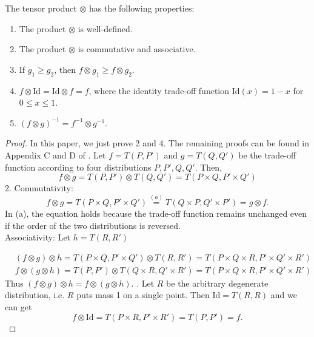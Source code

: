 \documentclass{article}
\begin{document}
\begin{theorem}
The tensor product $\otimes$ has the following properties:
    \begin{enumerate}
        \item The product $\otimes$ is well-defined.
        \item The product $\otimes$ is commutative and associative.
        \item If $g_1 \ge g_2$, then $f \otimes g_1 \ge f \otimes g_2$.
        \item $f \otimes \text{Id} =\text{Id} \otimes f = f$, where the identity trade-off function $\text{Id}(x) = 1-x$ for $0\le x \le 1$.
        \item $(f \otimes g)^{-1} = f^{-1} \otimes g^{-1}$.
    \end{enumerate}


    \begin{proof}
        In this paper, we just prove 2 and 4. The remaining proofs can be found in Appendix C and D of \cite{dong2022gaussian}.
        Let $f = T(P,P')$ and $g = T(Q,Q')$ be the trade-off function according to four distributions $P,P',Q,Q'$. Then,
    \begin{equation*}
        f \otimes g = T(P,P') \otimes T(Q,Q') = T(P \times Q, P' \times Q')
    \end{equation*}
    2. Commutativity:
    \begin{equation*}
        f \otimes g = T(P \times Q, P' \times Q') \overset{(a)}{=} T(Q \times P, Q' \times P') = g \otimes f.
    \end{equation*}
    In (a), the equation holds because the trade-off function remains unchanged even if the order of the two distributions is reversed.\\
    Associativity: Let $h= T(R,R')$
    
    \begin{align*}
        &(f\otimes g) \otimes h = T(P\times Q, P' \times Q') \otimes T(R, R') = T(P \times Q \times R, P' \times Q' \times R') \\
        &f \otimes (g \otimes h)= T(P,P')  \otimes T(Q\times R, Q' \times R') = T(P\times Q \times R, P' \times Q' \times R')
    \end{align*}
    Thus $(f \otimes g) \otimes h = f \otimes (g\otimes h)$.   . Let $R$ be the arbitrary degenerate distribution, i.e. $R$ puts mass 1 on a single point. Then $\text{Id} = T(R,R)$ and we can get 
    \begin{equation*}
        f\otimes \text{Id} = T(P \times R,P' \times R') = T(P,P') = f.
    \end{equation*}
    \end{proof}
\end{theorem}
\end{document}
